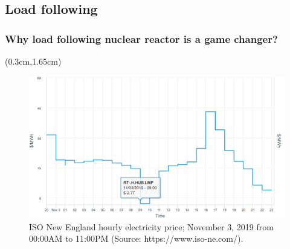\subsection{Load following}
\begin{frame}
\frametitle{Why load following nuclear reactor is a game changer?}
	\begin{textblock*}{12.1cm}(0.3cm,1.65cm) %
\begin{figure}[t]
	\includegraphics[width=\textwidth]{./images/ne_one_day_price.png}
		\vspace{-6mm}
	\caption{ISO New England hourly electricity price; November 3, 2019 
	from 00:00AM to 11:00PM (Source: https://www.iso-ne.com/).}
\end{figure}  
\end{textblock*}
\end{frame}

